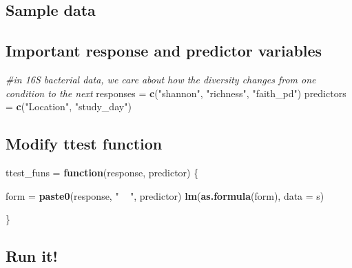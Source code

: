 \documentclass[]{article}
\newenvironment{Shaded}{\begin{snugshade}}{\end{snugshade}}
\newcommand{\KeywordTok}[1]{\textcolor[rgb]{0.13,0.29,0.53}{\textbf{#1}}}
\newcommand{\DataTypeTok}[1]{\textcolor[rgb]{0.13,0.29,0.53}{#1}}
\newcommand{\StringTok}[1]{\textcolor[rgb]{0.31,0.60,0.02}{#1}}
\newcommand{\CommentTok}[1]{\textcolor[rgb]{0.56,0.35,0.01}{\textit{#1}}}
\newcommand{\ControlFlowTok}[1]{\textcolor[rgb]{0.13,0.29,0.53}{\textbf{#1}}}
\newcommand{\OperatorTok}[1]{\textcolor[rgb]{0.81,0.36,0.00}{\textbf{#1}}}
\newcommand{\NormalTok}[1]{#1}
\begin{document}
\subsection{Sample data}\label{sample-data}

\subsection{Important response and predictor
variables}\label{important-response-and-predictor-variables}

\begin{Shaded}
\begin{Highlighting}[]
\CommentTok{#in 16S bacterial data, we care about how the diversity changes from one condition to the next}
\NormalTok{responses =}\StringTok{ }\KeywordTok{c}\NormalTok{(}\StringTok{"shannon"}\NormalTok{, }\StringTok{"richness"}\NormalTok{, }\StringTok{"faith_pd"}\NormalTok{)}
\NormalTok{predictors =}\StringTok{ }\KeywordTok{c}\NormalTok{(}\StringTok{"Location"}\NormalTok{, }\StringTok{"study_day"}\NormalTok{)}
\end{Highlighting}
\end{Shaded}

\subsection{Modify ttest function}\label{modify-ttest-function}

\begin{Shaded}
\begin{Highlighting}[]
\NormalTok{ttest_funs =}\StringTok{ }\ControlFlowTok{function}\NormalTok{(response, predictor) \{}
  
\NormalTok{  form =}\StringTok{ }\KeywordTok{paste0}\NormalTok{(response, }\StringTok{" ~ "}\NormalTok{, predictor)}
  \KeywordTok{lm}\NormalTok{(}\KeywordTok{as.formula}\NormalTok{(form), }\DataTypeTok{data =}\NormalTok{ s)}
  
\NormalTok{\}}
\end{Highlighting}
\end{Shaded}

\subsection{Run it!}\label{run-it}

\begin{Shaded}
\end{Shaded}
\end{document}
